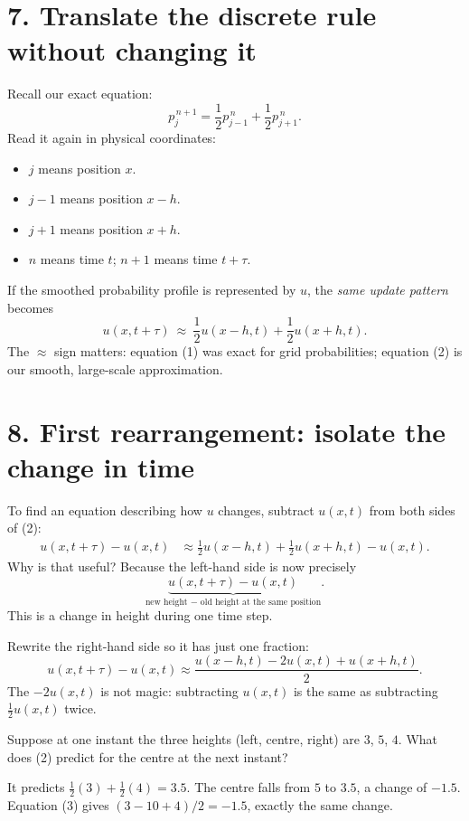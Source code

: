 \documentclass[11pt,a4paper]{article}
\newcommand{\ans}[1]{\par\vspace{4pt}{\small\color{blue}\textbf{Answer.}}\enspace #1}
\begin{document}
\section{7. Translate the discrete rule without changing it}
Recall our exact equation:
\[
 p_j^{\,n+1}=\frac12p_{j-1}^{\,n}+\frac12p_{j+1}^{\,n}.
\]
Read it again in physical coordinates:
\begin{itemize}[leftmargin=21pt,itemsep=4pt]
\item $j$ means position $x$.
\item $j-1$ means position $x-h$.
\item $j+1$ means position $x+h$.
\item $n$ means time $t$; $n+1$ means time $t+\tau$.
\end{itemize}
If the smoothed probability profile is represented by $u$, the \emph{same update pattern} becomes
\[
\boxed{u(x,t+\tau)\ \approx\ \frac12u(x-h,t)+\frac12u(x+h,t).}
\tag{2}
\]
The $\approx$ sign matters: equation (1) was exact for grid probabilities; equation (2) is our smooth, large-scale approximation.

\newpage
\section{8. First rearrangement: isolate the change in time}
To find an equation describing how $u$ changes, subtract $u(x,t)$ from both sides of (2):
\[
\begin{aligned}
 u(x,t+\tau)-u(x,t)
 &\approx \tfrac12u(x-h,t)+\tfrac12u(x+h,t)-u(x,t).
\end{aligned}
\]
Why is that useful? Because the left-hand side is now precisely
\[
\underbrace{u(x,t+\tau)-u(x,t)}_{\text{new height $-$ old height at the same position}}.
\]
This is a change in height during one time step.

Rewrite the right-hand side so it has just one fraction:
\[
\boxed{\displaystyle
u(x,t+\tau)-u(x,t)
\approx \frac{u(x-h,t)-2u(x,t)+u(x+h,t)}{2}.}
\tag{3}
\]
The $-2u(x,t)$ is not magic: subtracting $u(x,t)$ is the same as subtracting $\tfrac12u(x,t)$ twice.

\begin{think}
Suppose at one instant the three heights (left, centre, right) are $3$, $5$, $4$. What does (2) predict for the centre at the next instant?
\ans{It predicts $\tfrac12(3)+\tfrac12(4)=3.5$. The centre falls from $5$ to $3.5$, a change of $-1.5$. Equation (3) gives $(3-10+4)/2=-1.5$, exactly the same change.}
\end{think}
\end{document}
